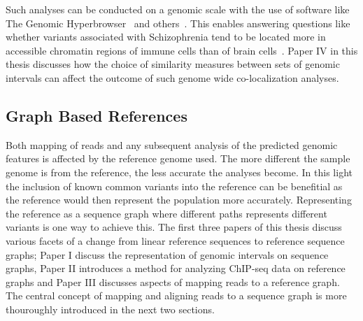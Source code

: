 Such analyses can be conducted on a genomic scale with the use of software like The Genomic Hyperbrowser~\cite{hyperbrowser} and others~\cite{colocstats, bedtools}.
This enables answering questions like whether variants associated with Schizophrenia tend to be located more in accessible chromatin regions of immune cells than of brain cells~\cite{hyperbrowserexample}. 
Paper IV in this thesis discusses how the choice of similarity measures between sets of genomic intervals can affect the outcome of such genome wide co-localization analyses.

\subsection{Graph Based References}
Both mapping of reads and any subsequent analysis of the predicted genomic features is affected by the reference genome used.
The more different the sample genome is from the reference, the less accurate the analyses become.
In this light the inclusion of known common variants into the reference can be benefitial as the reference would then represent the population more accurately.
Representing the reference as a sequence graph where different paths represents different variants is one way to achieve this.
The first three papers of this thesis discuss various facets of a change from linear reference sequences to reference sequence graphs; Paper I discuss the representation of genomic intervals on sequence graphs, Paper II introduces a method for analyzing ChIP-seq data on reference graphs and Paper III discusses aspects of mapping reads to a reference graph.
The central concept of mapping and aligning reads to a sequence graph is more thouroughly introduced in the next two sections. 


